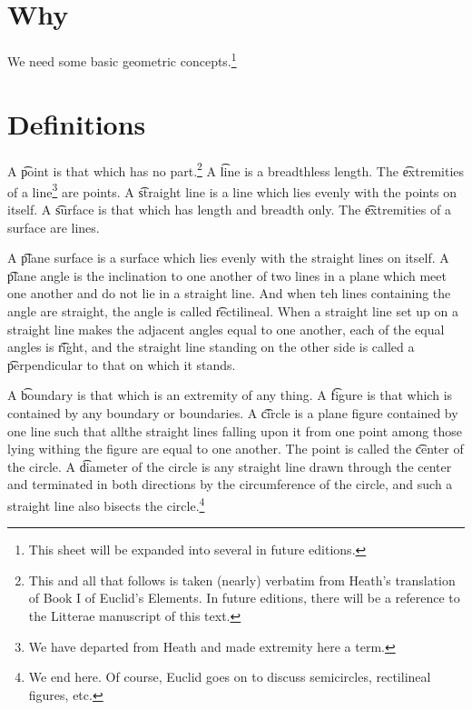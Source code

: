 

\section*{Why}

We need some basic geometric concepts.\footnote{This sheet will be expanded into several in future editions.}
\section*{Definitions}

A \t{point} is that which has no part.\footnote{This and all that follows is taken (nearly) verbatim from Heath's translation of Book I of Euclid's Elements. In future editions, there will be a reference to the Litterae manuscript of this text.}
A \t{line} is a breadthless length.
The \t{extremities of a line}\footnote{We have departed from Heath and made extremity here a term.}
are points.
A \t{straight line} is a line which lies evenly with the points on itself.
A \t{surface} is that which has length and breadth only.
The \t{extremities of a surface} are lines.

A \t{plane surface} is a surface which lies evenly with the straight lines on itself.
A \t{plane angle} is the inclination to one another of two lines in a plane which meet one another and do not lie in a straight line.
And when teh lines containing the angle are straight, the angle is called \t{rectilineal}.
When a straight line set up on a straight line makes the adjacent angles equal to one another, each of the equal angles is \t{right}, and the straight line standing on the other side is called a \t{perpendicular} to that on which it stands.


%  

A \t{boundary} is that which is an extremity of any thing.
A \t{figure} is that which is contained by any boundary or boundaries.
A \t{circle} is a plane figure contained by one line such that allthe straight lines falling upon it from one point among those lying withing the figure are equal to one another.
The point is called the \t{center} of the circle.
A \t{diameter} of the circle is any straight line drawn through the center and terminated in both directions by the circumference of the circle, and such a straight line also bisects the circle.\footnote{We end here. Of course, Euclid goes on to discuss semicircles, rectilineal figures, etc.}

\blankpage